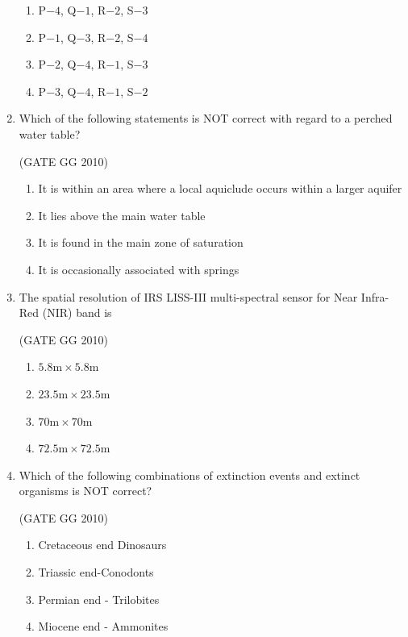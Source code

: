 \documentclass[journal]{IEEEtran}
\begin{document}
\begin{enumerate}
\begin{multicols}{2}
\begin{enumerate}
    \item  P$- 4$, Q$- 1$, R$- 2$, S$- 3$
    \item  P$- 1$, Q$- 3$, R$- 2$, S$- 4$
    \item  P$- 2$, Q$- 4$, R$- 1$, S$- 3$
    \item  P$- 3$, Q$- 4$, R$- 1$, S$- 2$
\end{enumerate}
\end{multicols}

\item Which of the following statements is NOT correct with regard to a perched water table?

\hfill (GATE GG 2010) 

\begin{enumerate}

    \item It is within an area where a local aquiclude occurs within a larger aquifer
    \item It lies above the main water table
    \item It is found in the main zone of saturation
    \item It is occasionally associated with springs

\end{enumerate}
\item The spatial resolution of IRS LISS-III multi-spectral sensor for Near Infra-Red (NIR) band is

\hfill (GATE GG 2010) 
\begin{multicols}{4}

\begin{enumerate}
    \item $5.8\text{m}\times 5.8\text{m}$ 
    \item $23.5\text{m}\times 23.5\text{m}$
    \item $70\text{m}\times 70\text{m}$
    \item $72.5\text{m}\times 72.5\text{m}$ 
\end{enumerate}
\end{multicols}

\item Which of the following combinations of extinction events and extinct organisms is NOT correct?

\hfill (GATE GG 2010) 
\begin{multicols}{2}

\begin{enumerate}
    \item Cretaceous end Dinosaurs
    \item Triassic end-Conodonts
    \item Permian end - Trilobites
    \item Miocene end - Ammonites
\end{enumerate}
\end{multicols}


\end{enumerate}
\end{document}
